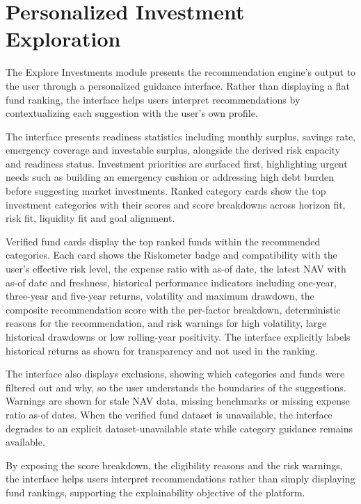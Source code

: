 \section{Personalized Investment Exploration}

The Explore Investments module presents the recommendation engine's output to the user through a personalized guidance interface. Rather than displaying a flat fund ranking, the interface helps users interpret recommendations by contextualizing each suggestion with the user's own profile.

The interface presents readiness statistics including monthly surplus, savings rate, emergency coverage and investable surplus, alongside the derived risk capacity and readiness status. Investment priorities are surfaced first, highlighting urgent needs such as building an emergency cushion or addressing high debt burden before suggesting market investments. Ranked category cards show the top investment categories with their scores and score breakdowns across horizon fit, risk fit, liquidity fit and goal alignment.

Verified fund cards display the top ranked funds within the recommended categories. Each card shows the Riskometer badge and compatibility with the user's effective risk level, the expense ratio with as-of date, the latest NAV with as-of date and freshness, historical performance indicators including one-year, three-year and five-year returns, volatility and maximum drawdown, the composite recommendation score with the per-factor breakdown, deterministic reasons for the recommendation, and risk warnings for high volatility, large historical drawdowns or low rolling-year positivity. The interface explicitly labels historical returns as shown for transparency and not used in the ranking.

The interface also displays exclusions, showing which categories and funds were filtered out and why, so the user understands the boundaries of the suggestions. Warnings are shown for stale NAV data, missing benchmarks or missing expense ratio as-of dates. When the verified fund dataset is unavailable, the interface degrades to an explicit dataset-unavailable state while category guidance remains available.

By exposing the score breakdown, the eligibility reasons and the risk warnings, the interface helps users interpret recommendations rather than simply displaying fund rankings, supporting the explainability objective of the platform.